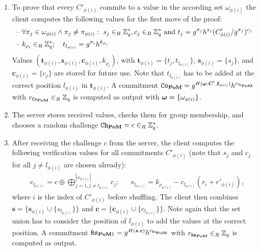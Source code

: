 \begin{enumerate}
  \item %
    To prove that every $C'_{\phi(i)}$ commits to a value in the according set $\omega_{\phi(i)}$ the client computes the following values for the first move of the proof:
    \begin{align*}
    \text{--}~ & \forall \pi_j\in\omega_{\phi(i)} \wedge \pi_j\not=\pi_{\phi(i)} :~ s_j\in_R\mathbb{Z}^\ast_q, c_j\in_R\mathbb{Z}^\ast_q \text{ and } t_j=g^{\pi_j}h^{s_j}(C'_{\phi(i)}/g^{\pi_j})^{c_j} \\      
    \text{--}~ & k_{\rho_i}\in_R\mathbb{Z}^\ast_q;\quad t_{l_{\phi(i)}}=g^{\pi_i}h^{k_{\rho_i}}
    \end{align*}
    Values $(\bm t_{\phi(i)}, \bm s_{\phi(i)}, \bm c_{\phi(i)}, k_{\rho_i})$, with $\bm t_{\phi(i)}=\{t_j, t_{l_{\phi(i)}}\}$, $\bm s_{\phi(i)}=\{s_j\}$, and $\bm c_{\phi(i)}=\{c_j\}$ are stored for future use.
    Note that $t_{l_{\phi(i)}}$ has to be added at the correct position $l_{\phi(i)}$ in $\bm t_{\phi(i)}$.
    A commitment $\mathtt{Co}_{\mathsf{\bf PoM}}=g^{H(\boldsymbol{\mathbf{\omega}}, \bm C', \bm t_{\phi(i)})} h^{r_{\mathtt{Co}_\mathsf{\bf PoM}}}$ with $r_{\mathtt{Co}_\mathsf{\bf PoM}}\in_R\mathbb{Z}_q$ is computed as output with $\boldsymbol{\mathbf{\omega}}=\{\omega_{\phi(i)}\}$.

  \item %
    The server stores received values, checks them for group membership, and chooses a random challenge $\mathtt{Ch}_\mathsf{\bf PoM}=c\in_R\mathbb{Z}^\ast_q$.

  \item %
    After receiving the challenge $c$ from the server, the client computes the following verification values for all commitments $C'_{\phi(i)}$ (note that $s_j$ and $c_j$ for all $j\not= l_{\phi(i)}$ are chosen already):
    \begin{align*}      
     & c_{l_{\phi(i)}}=c\oplus \bigoplus_{j=1,j\not=l_{\phi(i)}}^{|\omega_{\phi(i)}|} c_j;
     && s_{l_{\phi(i)}}=k_{\rho_{\phi(i)}} - c_{l_{\phi(i)}}(r_{i}+r'_{\phi(i)}),
    \end{align*}
    where $i$ is the index of $C'_{\phi(i)}$ before shuffling.
    The client then combines $\bm s = \{\bm s_{\phi(i)} \cup \{s_{l_{\phi(i)}}\}\}$ and $\bm c = \{\bm c_{\phi(i)} \cup \{c_{l_{\phi(i)}}\}\}$.
    Note again that the set union has to consider the position of $l_{\phi(i)}$ to add the values at the correct position.
    A commitment $\mathtt{Rs}_{\mathsf{\bf PoM}1}=g^{H(\bm s, \bm c)} h^{r_{\mathtt{Rs}_\mathsf{\bf PoM}}}$ with $r_{\mathtt{Rs}_\mathsf{\bf PoM}}\in_R\mathbb{Z}_q$ is computed as output.


\end{enumerate}
